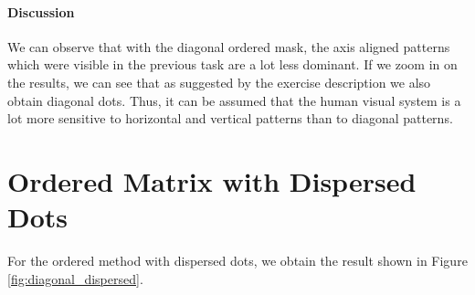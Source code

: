 \documentclass{article}
\begin{document}
\paragraph{Discussion} We can observe that with the diagonal ordered mask, the axis aligned patterns which were visible in the previous task are a lot less dominant. If we zoom in on the results, we can see that as suggested by the exercise description we also obtain diagonal dots. Thus, it can be assumed that the human visual system is a lot more sensitive to horizontal and vertical patterns than to diagonal patterns. 

\section{Ordered Matrix with Dispersed Dots}
For the ordered method with dispersed dots, we obtain the result shown in Figure \ref{fig:diagonal_dispersed}.
\end{document}
